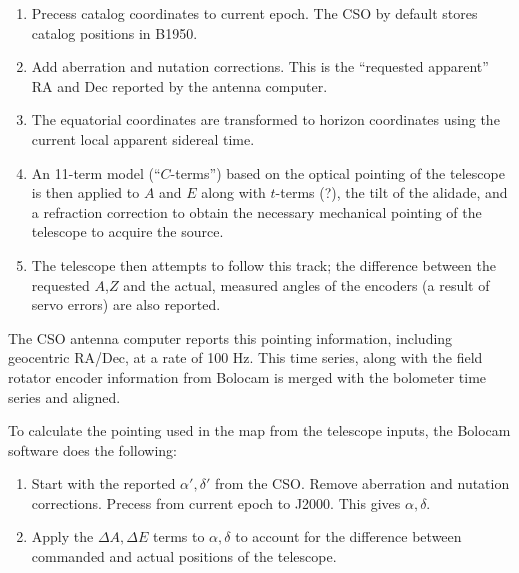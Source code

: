 \documentclass[12pt,preprint]{aastex}
\begin{document}
\begin{enumerate}

\item Precess catalog coordinates to current epoch.  The CSO by
default stores catalog positions in B1950.

\item Add aberration and nutation corrections.  This is the
``requested apparent'' RA and Dec reported by the antenna computer.

\item The equatorial coordinates are transformed to horizon
coordinates using the current local apparent sidereal time.

\item An 11-term model (``$C$-terms'') based on the optical pointing of
the telescope is then applied to $A$ and $E$ along with $t$-terms (?), %
the tilt of the alidade, and a refraction correction to obtain the
necessary mechanical pointing of the telescope to acquire the source.

\item The telescope then attempts to follow this track; the difference
between the requested $A$,$Z$ and the actual, measured angles of the
encoders (a result of servo errors) are also reported.



\end{enumerate}

The CSO antenna computer reports this pointing information, including
geocentric RA/Dec, at a rate of 100 Hz.  This time series, along with
the field rotator encoder information from Bolocam is merged with the
bolometer time series and aligned.

To calculate the pointing used in the map from the telescope inputs,
the Bolocam software does the following:

\begin{enumerate}

\item Start with the reported $\alpha',\delta'$ from the CSO.  Remove
aberration and nutation corrections.  Precess from current epoch to
J2000.  This gives $\alpha,\delta$.

\item Apply the $\Delta A,\Delta E$ terms to $\alpha,\delta$ to
account for the difference between commanded and actual positions of
the telescope.

\end{enumerate}
\end{document}
